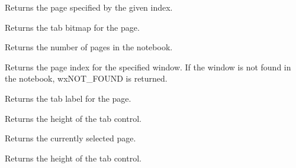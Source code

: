 \label{wxauinotebookgetpage}


Returns the page specified by the given index.

\label{wxauinotebookgetpagebitmap}


Returns the tab bitmap for the page.

\label{wxauinotebookgetpagecount}


Returns the number of pages in the notebook.

\label{wxauinotebookgetpageindex}


Returns the page index for the specified window.  If the window is not found in
the notebook, wxNOT\_FOUND is returned.

\label{wxauinotebookgetpagetext}


Returns the tab label for the page.

\label{wxauinotebookgettabctrlheight}


Returns the height of the tab control.

\label{wxauinotebookgetselection}


Returns the currently selected page.

\label{wxauinotebookgettabctrlheight}


Returns the height of the tab control.

\label{wxauinotebookinsertpage}


